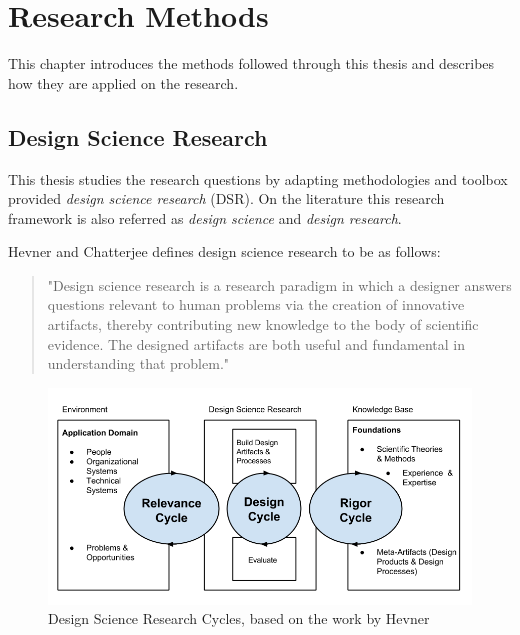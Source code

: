 
\chapter{Research Methods}

This chapter introduces the methods followed through this thesis and describes how they are applied on the research.





\section{Design Science Research}


This thesis studies the research questions by adapting methodologies and toolbox provided \textit{design science research} (DSR). On the literature this research framework is also referred as \textit{design science} and \textit{design research}.

Hevner and Chatterjee \cite{hevner_design_2010} defines design science research to be as follows:
\begin{quote}
	"Design science research is a research paradigm in which a designer answers questions relevant to human problems via the creation of innovative artifacts, thereby contributing new knowledge to the body of scientific evidence. The designed artifacts are both useful and fundamental in understanding that problem."
\end{quote}

\begin{figure}
\begin{center}
\includegraphics[width=1\textwidth]{assets/dsrcycles.png}
\end{center}
\caption{Design Science Research Cycles, based on the work by Hevner \cite{hevner_three_2007}}
\label{fig:dsrcycles}
\end{figure}


